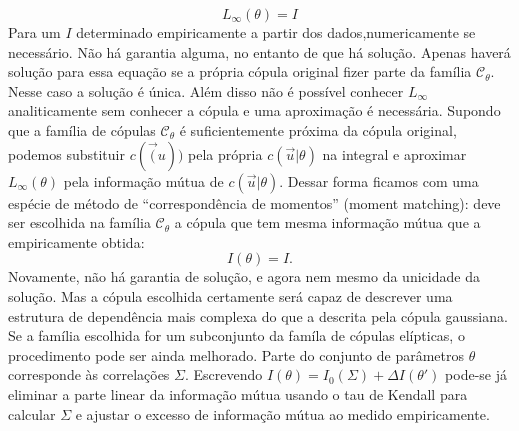 \[
 L_{\infty}(\theta) = I
\]
Para um $I$ determinado empiricamente a partir dos dados,numericamente se necessário. Não há garantia alguma, no entanto de que há solução. Apenas haverá solução para essa equação se a própria cópula original fizer parte da família $\mathcal{C}_\theta$. Nesse caso a solução é única. Além disso não é possível conhecer $L_\infty$ analiticamente sem conhecer a cópula e uma aproximação é necessária. Supondo que a família de cópulas $\mathcal{C}_\theta$ é suficientemente próxima da cópula original, podemos substituir $c(\vec(u))$ pela própria $c(\vec{u}|\theta)$ na integral e aproximar $L_\infty(\theta)$ pela informação mútua de $c(\vec{u}|\theta)$. Dessar forma ficamos com uma espécie de método de ``correspondência de momentos'' (moment matching): deve ser escolhida na família $\mathcal{C}_\theta$ a cópula que tem mesma informação mútua que a empiricamente obtida:
\[
 I(\theta) = I.
\]
Novamente, não há garantia de solução, e agora nem mesmo da unicidade da solução. Mas a cópula escolhida certamente será capaz de descrever uma estrutura de dependência mais complexa do que a descrita pela cópula gaussiana. Se a família escolhida for um subconjunto da famíla de cópulas elípticas, o procedimento pode ser ainda melhorado. Parte do conjunto de parâmetros $\theta$ corresponde às correlações $\Sigma$. Escrevendo $I(\theta) = I_{0}(\Sigma) + \Delta I(\theta')$ pode-se já eliminar a parte linear da informação mútua usando o tau de Kendall para calcular $\Sigma$ e ajustar o excesso de informação mútua ao medido empiricamente.

